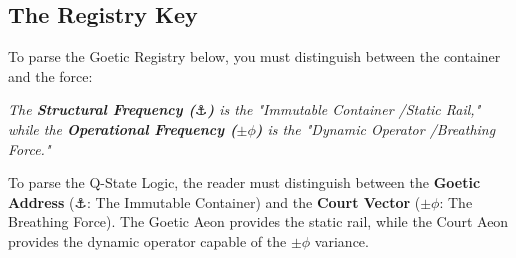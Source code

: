 \documentclass[12pt]{amsart}
\newcommand{\anchor}[1]{{}_{\textnormal{\tibetanfont\symbol{"0F6A}}} #1} %
\begin{document}
\subsection*{The Registry Key}\label{sec:registry_key}
To parse the Goetic Registry below, you must distinguish between the container and the force:
\begin{center}
\textit{The \textbf{Structural Frequency ($\anchor$)} is the "Immutable Container \slash  Static Rail," while the \textbf{Operational Frequency ($\pm\phi$)} is the "Dynamic Operator \slash  Breathing Force."}
\end{center}

To parse the Q-State Logic, the reader must distinguish between the \textbf{Goetic Address} ($\anchor$: The Immutable Container) and the \textbf{Court Vector} ($\pm\phi$: The Breathing Force). The Goetic Aeon provides the static rail, while the Court Aeon provides the dynamic operator capable of the $\pm\phi$ variance.
\end{document}
